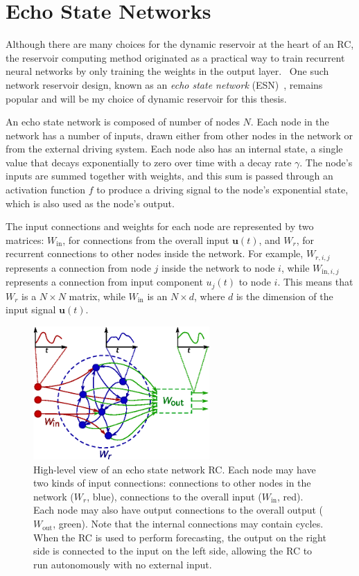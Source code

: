 \section{Echo State Networks}\label{sec:esn}

Although there are many choices for the dynamic reservoir at the heart
of an RC, the reservoir computing method originated as a practical way
to train recurrent neural networks by only training the weights in the
output layer.~\cite{lukosevicius2009} One such network reservoir
design, known as an \emph{echo state network} (ESN)~\cite{jaeger2001},
remains popular and will be my choice of dynamic reservoir for this
thesis.

An echo state network is composed of number of nodes $N$. Each node in
the network has a number of inputs, drawn either from other nodes in
the network or from the external driving system. Each node also has an
internal state, a single value that decays exponentially to zero over
time with a decay rate $\gamma$. The node's inputs are summed together
with weights, and this sum is passed through an activation function
$f$ to produce a driving signal to the node's exponential state, which
is also used as the node's output.

The input connections and weights for each node are represented by two
matrices: $W_\text{in}$, for connections from the overall input
$\bm{u}(t)$, and $W_r$, for recurrent connections to other nodes
inside the network. For example, $W_{r,i,j}$ represents a connection
from node $j$ inside the network to node $i$, while
$W_{\text{in},i,j}$ represents a connection from input component
$u_j(t)$ to node $i$. This means that $W_r$ is a $N \times N$ matrix,
while $W_\text{in}$ is an $N \times d$, where $d$ is the dimension of
the input signal $\bm{u}(t)$.

\begin{figure}
  \includegraphics[width=0.6\textwidth]{figures/reservoir}
  \caption{High-level view of an echo state network RC. Each node may
    have two kinds of input connections: connections to other nodes in
    the network ($W_r$, blue), connections to the overall input
    ($W_\text{in}$, red). Each node may also have output connections
    to the overall output ($W_\text{out}$, green). Note that the
    internal connections may contain cycles.  When the RC is used to
    perform forecasting, the output on the right side is connected to
    the input on the left side, allowing the RC to run autonomously
    with no external input.}%
  \label{fig:reservoir}
\end{figure}

